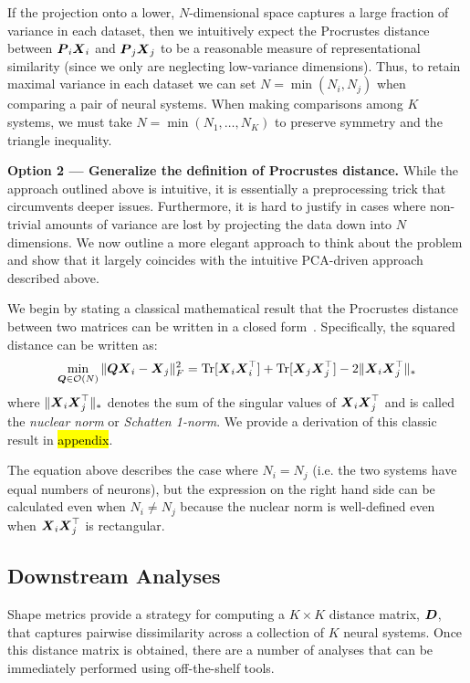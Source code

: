 If the projection onto a lower, $N$-dimensional space captures a large fraction of variance in each dataset, then we intuitively expect the Procrustes distance between $\boldsymbol{P}_i \boldsymbol{X}_i$ and $\boldsymbol{P}_j \boldsymbol{X}_j$ to be a reasonable measure of representational similarity (since we only are neglecting low-variance dimensions).
Thus, to retain maximal variance in each dataset we can set $N = \min(N_i, N_j)$ when comparing a pair of neural systems.
When making comparisons among $K$ systems, we must take $N = \min(N_1, \dots, N_K)$ to preserve symmetry and the triangle inequality.

\textbf{Option 2 --- Generalize the definition of Procrustes distance.}
While the approach outlined above is intuitive, it is essentially a preprocessing trick that circumvents deeper issues.
Furthermore, it is hard to justify in cases where non-trivial amounts of variance are lost by projecting the data down into $N$ dimensions.
We now outline a more elegant approach to think about the problem and show that it largely coincides with the intuitive PCA-driven approach described above.

We begin by stating a classical mathematical result that the Procrustes distance between two matrices can be written in a closed form~\parencite{schonemann1966generalized}.
Specifically, the squared distance can be written as:
\begin{equation}
\label{eq:procrustes-closed-form-1}
\min_{\boldsymbol{Q} \in \mathcal{O}(N)} \Vert \boldsymbol{Q} \boldsymbol{X}_i - \boldsymbol{X}_j \Vert_F^2 = \operatorname*{Tr}[ \boldsymbol{X}_i \boldsymbol{X}_i^\top ] + \operatorname*{Tr}[ \boldsymbol{X}_j \boldsymbol{X}_j^\top ] - 2 \Vert \boldsymbol{X}_i \boldsymbol{X}_j^\top \Vert_*
\end{equation}
where $\Vert \boldsymbol{X}_i \boldsymbol{X}_j^\top \Vert_*$ denotes the sum of the singular values of $\boldsymbol{X}_i \boldsymbol{X}_j^\top$ and is called the \textit{nuclear norm} or \textit{Schatten 1-norm}.
We provide a derivation of this classic result in \hl{appendix}.

The equation above describes the case where $N_i = N_j$ (i.e. the two systems have equal numbers of neurons), but the expression on the right hand side can be calculated even when $N_i \neq N_j$ because the nuclear norm is well-defined even when $\boldsymbol{X}_i \boldsymbol{X}_j^\top$ is rectangular.


\subsection{Downstream Analyses}

Shape metrics provide a strategy for computing a $K \times K$ distance matrix, $\boldsymbol{D}$, that captures pairwise dissimilarity across a collection of $K$ neural systems.
Once this distance matrix is obtained, there are a number of analyses that can be immediately performed using off-the-shelf tools.

